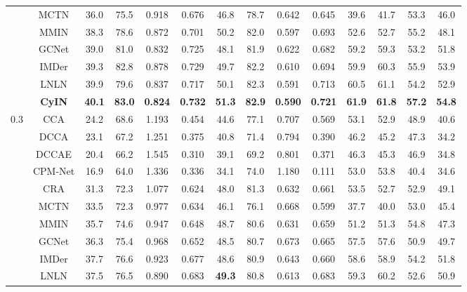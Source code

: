 \documentclass{article}
\begin{document}
\begin{table}[htbp]
{\begin{tabular}{cccccccccccccc}
        ~ & MCTN & 36.0 & 75.5 & 0.918 & 0.676  & 46.8  & 78.7  & 0.642  & 0.645  & 39.6  & 41.7  & 53.3  & 46.0  \\ 
        ~ & MMIN & 38.3  & 78.6  & 0.872  & 0.701  & 50.2  & 82.0  & 0.597  & 0.693  & 52.6  & 52.7  & 55.2  & 48.1 \\ 
        ~ & GCNet & 39.0  & 81.0  & 0.832  & 0.725  & 48.1  & 81.9  & 0.622  & 0.682  & 59.2  & 59.3  & 53.2  & 51.8  \\ 
        ~ & IMDer & 39.3  & 82.8  & 0.878  & 0.729  & 49.7  & 82.2  & 0.610  & 0.694  & 59.9  & 60.3  & 55.9  & 53.9 \\ 
        ~ & LNLN & 39.9  & 79.6  & 0.837  & 0.717  & 50.1  & 82.3  & 0.591  & 0.713  & 60.5  & 61.1  & 54.2  & 52.9  \\ 
    & \textbf{CyIN} & \textbf{40.1} & \textbf{83.0} & \textbf{0.824} & \textbf{0.732} & \textbf{51.3} & \textbf{82.9} & \textbf{0.590} & \textbf{0.721} & \textbf{61.9} & \textbf{61.8} & \textbf{57.2} & \textbf{54.8} \\  
    \midrule[0.5pt]
    \multirow{11}{*}{$0.3$} ~ & CCA & 24.2  & 68.6  & 1.193  & 0.454  & 44.6  & 77.1  & 0.707  & 0.569  & 53.1  & 52.9  & 48.9  & 40.6  \\ 
        ~ & DCCA & 23.1  & 67.2  & 1.251  & 0.375  & 40.8  & 71.4  & 0.794  & 0.390  & 46.2  & 45.2  & 47.3  & 34.2  \\ 
        ~ & DCCAE & 20.4  & 66.2  & 1.545  & 0.310  & 39.1  & 69.2  & 0.801  & 0.371  & 46.3  & 45.3  & 46.9  & 34.8  \\ 
        ~ & CPM-Net & 16.9  & 64.0  & 1.336  & 0.336  & 34.1  & 74.0  & 1.180  & 0.111  & 53.0  & 53.8  & 40.4  & 34.6  \\ 
        ~ & CRA & 31.3  & 72.3  & 1.077  & 0.624  & 48.0  & 81.3  & 0.632  & 0.661  & 53.5  & 52.7  & 52.9  & 49.1  \\ 
        ~ & MCTN & 33.5  & 72.3  & 0.977  & 0.634  & 46.1  & 76.1  & 0.668  & 0.599  & 37.7  & 40.0  & 53.0  & 45.4  \\ 
        ~ & MMIN & 35.7  & 74.6  & 0.947  & 0.648  & 48.7  & 80.6  & 0.631  & 0.659  & 51.2  & 51.3  & 54.8  & 47.3 \\
        ~ & GCNet & 36.3  & 75.4  & 0.968  & 0.652  & 48.5  & 80.7  & 0.673  & 0.665  & 57.5  & 57.6  & 50.9  & 49.7  \\ 
        ~ & IMDer & 37.7  & 76.6  & 0.923  & 0.677  & 48.6  & 80.9  & 0.643  & 0.660  & 58.6  & 58.9  & 54.2  & 51.8 \\ 
        ~ & LNLN & 37.5  & 76.5  & 0.890  & 0.683  & \textbf{49.3}  & 80.8  & 0.613  & 0.683  & 59.3  & 60.2  & 52.6  & 50.9  \\ 

\end{tabular}}
\end{table}
\end{document}
